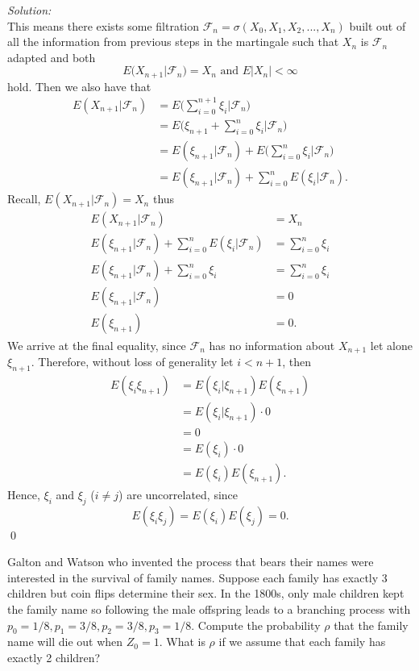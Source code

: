 \documentclass[10pt]{amsart}
\begin{document}
\noindent
\textit{Solution:} \\
This means there exists some filtration $\mathcal F_n = \sigma(X_0, X_1, X_2, ..., X_n)$ built out of all the information from previous steps in the martingale such that $X_n$ is $\mathcal F_n$ adapted and both
$$E (X_{n + 1} | \mathcal F_n) = X_n \text{ and }E |X_n| < \infty$$
hold.
Then we also have that
\begin{align*}
E (X_{n + 1} | \mathcal F_n) &= E\bigg( \sum_{i=0}^{n+1} \xi_i \bigg| \mathcal F_n \bigg) \\
	&= E\bigg( \xi_{n + 1} + \sum_{i=0}^n \xi_i \bigg| \mathcal F_n \bigg) \\
	&= E ( \xi_{n + 1} | \mathcal F_n ) + E\bigg( \sum_{i=0}^n \xi_i \bigg| \mathcal F_n \bigg) \\
	&= E ( \xi_{n + 1} | \mathcal F_n ) + \sum_{i=0}^n E( \xi_i | \mathcal F_n).
\end{align*}
Recall, $E (X_{n + 1} | \mathcal F_n) = X_n$ thus
\begin{align*}
E (X_{n + 1} | \mathcal F_n) &= X_n \\
E ( \xi_{n + 1} | \mathcal F_n ) + \sum_{i=0}^n E( \xi_i | \mathcal F_n) &= \sum_{i=0}^n \xi_i \\
E ( \xi_{n + 1} | \mathcal F_n ) + \sum_{i=0}^n \xi_i &= \sum_{i=0}^n \xi_i \\
E ( \xi_{n + 1} | \mathcal F_n ) &= 0 \\
E ( \xi_{n + 1}) &= 0.
\end{align*}
We arrive at the final equality, since $\mathcal F_n$ has no information about $X_{n + 1}$ let alone $\xi_{n + 1}$.
Therefore, without loss of generality let $ i < n + 1$, then 
\begin{align*}
E(\xi_i\xi_{n + 1})
	&= E(\xi_i | \xi_{n + 1}) E(\xi_{n + 1}) \\
	&= E(\xi_i | \xi_{n + 1}) \cdot 0 \\
	&= 0 \\
	&= E(\xi_i) \cdot 0 \\
	&= E(\xi_i)E(\xi_{n + 1}).
\end{align*}
Hence, $\xi_i$ and $\xi_j$ ($i\neq j$) are uncorrelated, since
$$E(\xi_i\xi_j) = E(\xi_i)E(\xi_j) = 0.$$
\qed \\

\newpage

 Galton and Watson who invented the process that bears their names were interested in the survival of family names. Suppose each family has exactly 3 children but coin flips determine their sex. In the 1800s, only male children kept the family name so following the male offspring leads to a branching process with $p_0 = 1/8, p_1 = 3/8, p_2 = 3/8, p_3 = 1/8$. Compute the probability $\rho$ that the family name will die out when $Z_0 = 1$. What is $\rho$ if we assume that each family has exactly 2 children? \\
\end{document}
